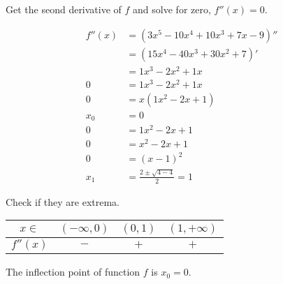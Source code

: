 Get the seond derivative of $f$ and 
solve for zero, $f''(x) = 0$.

\begin{align}
    f''(x) &= \left( 3x^5 -10x^4 +10x^3 + 7x -9 \right)'' \\
    &= \left( 15x^4 - 40x^3 +30x^2 + 7 \right)' \\
    &= 1x^3 - 2x^2 + 1x \\
    0 &= 1x^3 - 2x^2 + 1x \\
    0 &= x(1x^2 - 2x + 1) \\
    x_0 &= 0 \\
    0 &= 1x^2 - 2x + 1 \\
    0 &= x^2 - 2x + 1 \\
    0 &= (x - 1)^2 \\
    x_{1} &= \frac{2 \pm \sqrt{4 - 4}}{2} = 1
\end{align}

Check if they are extrema.

\begin{center}
    \begin{tabular}{|c|c|c|c|}
        \hline
        $x \in$ & $(-\infty,0)$ & $(0,1)$ & $(1,+\infty)$\\ \hline
        $f''(x)$ & $-$ & $+$ & $+$ \\ \hline
    \end{tabular}
\end{center}

The inflection point of function $f$ is $x_0 = 0$.